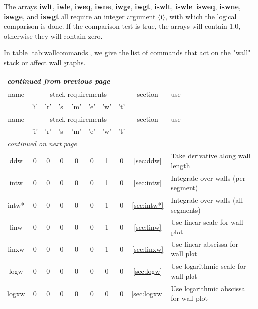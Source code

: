 \documentclass[a4paper,10pt]{report}
\begin{document}
The arrays {\bf iwlt}, {\bf iwle}, {\bf iweq}, {\bf iwne}, {\bf iwge}, {\bf iwgt},
{\bf iswlt}, {\bf iswle}, {\bf isweq}, {\bf iswne}, {\bf iswge}, and {\bf iswgt}
all require an integer argument $\langle$i$\rangle$,
with which the logical comparison is done. If the comparison test is true, the arrays
will contain 1.0, otherwise they will contain zero.

In table \ref{tab:wallcommands}, we give the list of commands that
act on the "wall" stack or affect wall graphs.

\begin{center}
  \begin{longtable}{|c|c|c|c|c|c|c|c|c|l|}
    \hline
    \multicolumn{10}{|l|}{\small\sl continued from previous page} \\
    \hline name & \multicolumn{7}{|c|}{stack requirements} & section & use \\
    \hline   & 'i' & 'r' & 's' & 'm' & 'e' & 'w' & 't' &   &   \\
    \hline \endhead
    \hline name & \multicolumn{7}{|c|}{stack requirements} & section & use \\
    \hline   & 'i' & 'r' & 's' & 'm' & 'e' & 'w' & 't' &   &   \\
    \hline \endfirsthead
    \hline
    \multicolumn{9}{|l|}{\small\sl continued on next page} \\
    \hline \endfoot
    \endlastfoot
    ddw \index{b2plot, ddw}       & 0 & 0 & 0 & 0 & 0 & 1 & 0 & \ref{sec:ddw}      & Take derivative along wall length \\
    intw \index{b2plot, intw}     & 0 & 0 & 0 & 0 & 0 & 1 & 0 & \ref{sec:intw}     & Integrate over walls (per segment) \\
    intw* \index{b2plot, intw*}   & 0 & 0 & 0 & 0 & 0 & 1 & 0 & \ref{sec:intw*}    & Integrate over walls (all segments) \\
    linw \index{b2plot, linw}     & 0 & 0 & 0 & 0 & 0 & 1 & 0 & \ref{sec:linw}     & Use linear scale for wall plot \\
    linxw \index{b2plot, linxw}   & 0 & 0 & 0 & 0 & 0 & 1 & 0 & \ref{sec:linxw}    & Use linear abscissa for wall plot \\
    logw \index{b2plot, logw}     & 0 & 0 & 0 & 0 & 0 & 0 & 0 & \ref{sec:logw}     & Use logarithmic scale for wall plot \\
    logxw \index{b2plot, logxw}   & 0 & 0 & 0 & 0 & 0 & 0 & 0 & \ref{sec:logxw}    & Use logarithmic abscissa for wall plot \\

\end{longtable}
\end{center}
\end{document}
